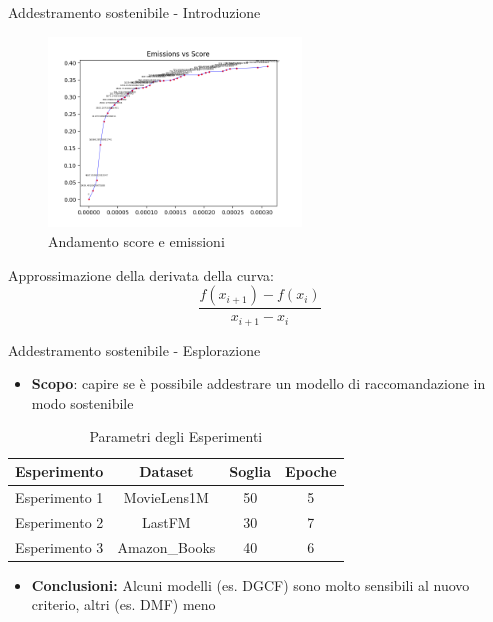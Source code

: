 \begin{frame}{Addestramento sostenibile - Introduzione}
    \begin{figure}
        \centering
        \includegraphics[width=0.6\textwidth]{images/curve_emissions_score.png}
        \caption{Andamento score e emissioni}
    \end{figure} 
Approssimazione della derivata della curva:
\begin{equation*}
    \frac{f(x_{i+1}) - f(x_i)}{x_{i+1} - x_i}
\end{equation*}
\end{frame}

\begin{frame}{Addestramento sostenibile - Esplorazione}
    \begin{itemize}
        \item \textbf{Scopo}: capire se è possibile addestrare un modello di raccomandazione in modo sostenibile
    \end{itemize}
    \begin{table}[]
        \centering
        \begin{tabular}{|c|c|c|c|}
            \hline
            \textbf{Esperimento} & \textbf{Dataset} & \textbf{Soglia} & \textbf{Epoche} \\ \hline
            Esperimento 1 & MovieLens1M & 50 & 5 \\ \hline
            Esperimento 2 & LastFM & 30 & 7 \\ \hline
            Esperimento 3 & Amazon\_Books & 40 & 6 \\ \hline
        \end{tabular}
        \caption{Parametri degli Esperimenti}
    \end{table}
    \begin{itemize}
        \item \textbf{Conclusioni:} Alcuni modelli (es. DGCF) sono molto sensibili al nuovo criterio, altri (es. DMF) meno
    \end{itemize}
\end{frame}



